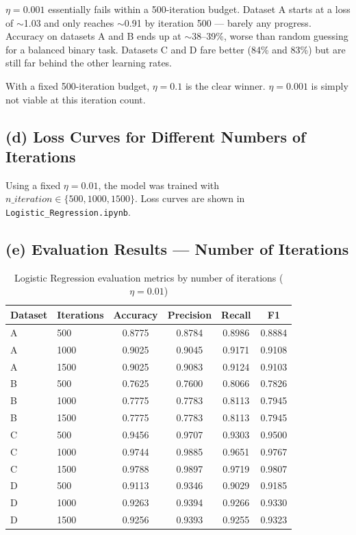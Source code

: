 \documentclass[11pt,a4paper]{article}
\begin{document}
$\eta = 0.001$ essentially fails within a 500-iteration budget. Dataset A starts at a loss of $\sim$1.03 and only reaches $\sim$0.91 by iteration 500 --- barely any progress. Accuracy on datasets A and B ends up at $\sim$38--39\%, worse than random guessing for a balanced binary task. Datasets C and D fare better (84\% and 83\%) but are still far behind the other learning rates.

With a fixed 500-iteration budget, $\eta = 0.1$ is the clear winner. $\eta = 0.001$ is simply not viable at this iteration count.

\subsection{(d) Loss Curves for Different Numbers of Iterations}

Using a fixed $\eta = 0.01$, the model was trained with $n\_iteration \in \{500, 1000, 1500\}$. Loss curves are shown in \texttt{Logistic\_Regression.ipynb}.

\subsection{(e) Evaluation Results --- Number of Iterations}

\begin{table}[H]
\centering
\caption{Logistic Regression evaluation metrics by number of iterations ($\eta = 0.01$)}
\label{tab:logreg_iter}
\begin{tabular}{llcccc}
\toprule
\textbf{Dataset} & \textbf{Iterations} & \textbf{Accuracy} & \textbf{Precision} & \textbf{Recall} & \textbf{F1} \\
\midrule
A & 500  & 0.8775 & 0.8784 & 0.8986 & 0.8884 \\
A & 1000 & 0.9025 & 0.9045 & 0.9171 & 0.9108 \\
A & 1500 & 0.9025 & 0.9083 & 0.9124 & 0.9103 \\
\midrule
B & 500  & 0.7625 & 0.7600 & 0.8066 & 0.7826 \\
B & 1000 & 0.7775 & 0.7783 & 0.8113 & 0.7945 \\
B & 1500 & 0.7775 & 0.7783 & 0.8113 & 0.7945 \\
\midrule
C & 500  & 0.9456 & 0.9707 & 0.9303 & 0.9500 \\
C & 1000 & 0.9744 & 0.9885 & 0.9651 & 0.9767 \\
C & 1500 & 0.9788 & 0.9897 & 0.9719 & 0.9807 \\
\midrule
D & 500  & 0.9113 & 0.9346 & 0.9029 & 0.9185 \\
D & 1000 & 0.9263 & 0.9394 & 0.9266 & 0.9330 \\
D & 1500 & 0.9256 & 0.9393 & 0.9255 & 0.9323 \\
\bottomrule
\end{tabular}
\end{table}
\end{document}

